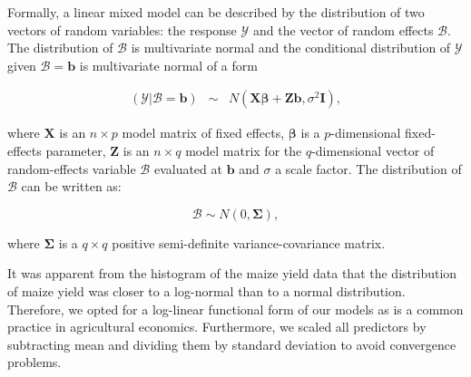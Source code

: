 \documentclass[12pt]{iopart}
\begin{document}
Formally, a linear mixed model can be described by the distribution of two vectors of random variables: the response $\mathscr{Y}$ and the vector of random effects $\mathscr{B}$. The distribution of $\mathscr{B}$ is multivariate normal and the conditional distribution of $\mathscr{Y}$ given $\mathscr{B}=\mathbf{b}$ is multivariate normal of a form %




\begin{equation}\label{MixedGeneral}
\begin{array}{lcl}

(\mathscr{Y}|\mathscr{B}=\mathbf{b})& \sim & \mathit{N}(\mathbf{X}\mathbf{\beta}+\mathbf{Z}\mathbf{b},\sigma^2\mathbf{I}),

\end{array}
\end{equation}

where $\mathbf{X}$ is an $n \times p$ model matrix of fixed effects, $\mathbf{\beta}$ is a $p$-dimensional fixed-effects parameter, $\mathbf{Z}$ is an $n \times q$ model matrix for the $q$-dimensional vector of random-effects variable $\mathscr{B}$ evaluated at $\mathbf{b}$ and $\sigma$ a scale factor. The distribution of $\mathscr{B}$ can be written as: 

\begin{equation}\label{ranefDist}
\mathscr{B} \sim \mathit{N}(0,\mathbf{\Sigma}),
\end{equation}

where $\mathbf{\Sigma}$ is a $q \times q$ positive semi-definite variance-covariance matrix.





It was apparent from the histogram of the maize yield data that the distribution of maize yield was closer to a log-normal than to a normal distribution. Therefore, we opted for a log-linear functional form of our models as is a common practice in agricultural economics. Furthermore, we scaled all predictors by subtracting mean and dividing them by standard deviation to avoid convergence problems.
\end{document}
